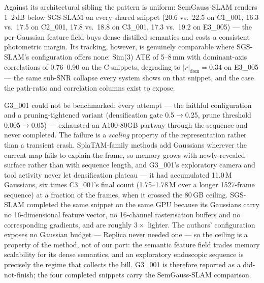 Against its architectural sibling the pattern is uniform: SemGauss-SLAM renders
1--2\,dB below SGS-SLAM on every shared snippet (20.6 vs.\ 22.5 on C1\_001,
16.3 vs.\ 17.5 on C2\_001, 17.8 vs.\ 18.8 on C3\_001, 17.3 vs.\ 19.2 on
E3\_005) --- the per-Gaussian feature field buys dense distilled semantics and
costs a consistent photometric margin. Its tracking, however, is genuinely
comparable where SGS-SLAM's configuration offers none: Sim(3) ATE of
5--8\,mm with dominant-axis correlations of 0.76--0.90 on the C-snippets,
degrading to $|r|_{\mathrm{dom}}=0.34$ on E3\_005 --- the same sub-SNR
collapse every system shows on that snippet, and the case the path-ratio and
correlation columns exist to expose.

G3\_001 could not be benchmarked: every attempt --- the faithful configuration
and a pruning-tightened variant (densification gate 0.5$\rightarrow$0.25, prune
threshold 0.005$\rightarrow$0.05) --- exhausted an A100-80GB partway through the
sequence and never completed. The failure is a \emph{scaling} property of the
representation rather than a transient crash. SplaTAM-family methods add
Gaussians wherever the current map fails to explain the frame, so memory grows
with newly-revealed surface rather than with sequence length, and G3\_001's
exploratory camera and tool activity never let densification plateau --- it had
accumulated 11.0\,M Gaussians, six times C3\_001's final count (1.75--1.78\,M
over a longer 1527-frame sequence) at a fraction of the frames, when it crossed
the 80\,GB ceiling. SGS-SLAM completed the same snippet on the same GPU because
its Gaussians carry no 16-dimensional feature vector, no 16-channel
rasterisation buffers and no corresponding gradients, and are roughly
$3\times$ lighter. The authors' configuration exposes no Gaussian budget ---
Replica never needed one --- so the ceiling is a property of the method, not of
our port: the semantic feature field trades memory scalability for its dense
semantics, and an exploratory endoscopic sequence is precisely the regime that
collects the bill. G3\_001 is therefore reported as a did-not-finish; the four
completed snippets carry the SemGauss-SLAM comparison.


